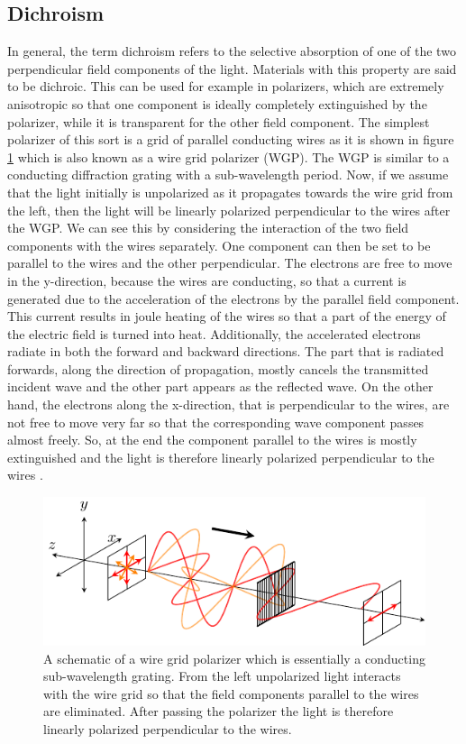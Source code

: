 \subsection{Dichroism}
\label{sec:dichroism}
In general, the term dichroism refers to the selective absorption of one of the two perpendicular field components of the light. Materials with this property are said to be dichroic. This can be used for example in polarizers, which are extremely anisotropic so that one component is ideally completely extinguished by the polarizer, while it is transparent for the other field component. The simplest polarizer of this sort is a grid of parallel conducting wires as it is shown in figure \ref{fig:wire_grid_polarizer} which is also known as a wire grid polarizer (WGP). The WGP is similar to a conducting diffraction grating with a sub-wavelength period. Now, if we assume that the light initially is unpolarized as it propagates towards the wire grid from the left, then the light will be linearly polarized perpendicular to the wires after the WGP. We can see this by considering the interaction of the two field components with the wires separately. One component can then be set to be parallel to the wires and the other perpendicular. The electrons are free to move in the y-direction, because the wires are conducting, so that a current is generated due to the acceleration of the electrons by the parallel field component. This current results in joule heating of the wires so that a part of the energy of the electric field is turned into heat. Additionally, the accelerated electrons radiate in both the forward and backward directions. The part that is radiated forwards, along the direction of propagation, mostly cancels the transmitted incident wave and the other part appears as the reflected wave. On the other hand, the electrons along the x-direction, that is perpendicular to the wires, are not free to move very far so that the corresponding wave component passes almost freely. So, at the end the component parallel to the wires is mostly extinguished and the light is therefore linearly polarized perpendicular to the wires \cite{Hecht}.

\begin{figure}[h]
    \centering
    \includegraphics[scale=1.30]{images/theory/tikz_wire_grid_polarizer.pdf}
    \caption{A schematic of a wire grid polarizer which is essentially a conducting sub-wavelength grating. From the left unpolarized light interacts with the wire grid so that the field components parallel to the wires are eliminated. After passing the polarizer the light is therefore linearly polarized perpendicular to the wires.}
    \label{fig:wire_grid_polarizer}
\end{figure}

